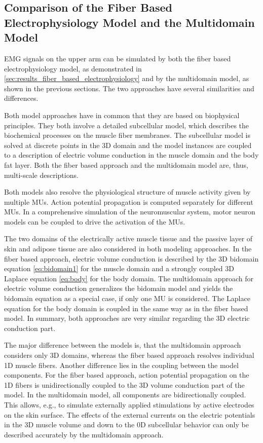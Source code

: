 \subsection{Comparison of the Fiber Based Electrophysiology Model and the Multidomain Model}\label{sec:multidomain_differences}

EMG signals on the upper arm can be simulated by both the fiber based electrophysiology model, as demonstrated in \cref{sec:results_fiber_based_electrophysiology} and by the multidomain model, as shown in the previous sections. The two approaches have several similarities and differences.

Both model approaches have in common that they are based on biophysical principles. They both involve a detailed subcellular model, which describes the biochemical processes on the muscle fiber membranes. The subcellular model is solved at discrete points in the 3D domain and the model instances are coupled to a description of electric volume conduction in the muscle domain and the body fat layer.  Both the fiber based approach and the multidomain model are, thus, multi-scale descriptions. 

Both models also resolve the physiological structure of muscle activity given by multiple MUs. Action potential propagation is computed separately for different MUs. In a comprehensive simulation of the neuromuscular system, motor neuron models can be coupled to drive the activation of the MUs.

The two domains of the electrically active muscle tissue and the passive layer of skin and adipose tissue are also considered in both modeling approaches. In the fiber based approach, electric volume conduction is described by the 3D bidomain equation \cref{eq:bidomain1} for the muscle domain and a strongly coupled 3D Laplace equation \cref{eq:body} for the body domain.
The multidomain approach for electric volume conduction generalizes the bidomain model and yields the bidomain equation as a special case, if only one MU is considered. The Laplace equation for the body domain is coupled in the same way as in the fiber based model. In summary, both approaches are very similar regarding the 3D electric conduction part.

The major difference between the models is, that the multidomain approach considers only 3D domains, whereas the fiber based approach resolves individual 1D muscle fibers. Another difference lies in the coupling between the model components. For the fiber based approach, action potential propagation on the 1D fibers is unidirectionally coupled to the 3D volume conduction part of the model. In the multidomain model, all components are bidirectionally coupled. This allows, e.g., to simulate externally applied stimulations by active electrodes on the skin surface. The effects of the external currents on the electric potentials in the 3D muscle volume and down to the 0D subcellular behavior can only be described accurately by the multidomain approach.

